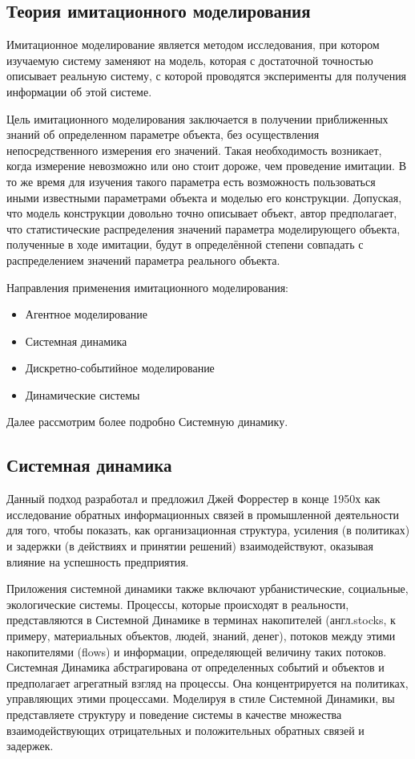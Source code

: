 \subsection{Теория имитационного моделирования}

Имитационное моделирование является методом исследования, при котором изучаемую систему заменяют на модель, которая с достаточной точностью описывает реальную систему, с которой проводятся эксперименты для получения информации об этой системе.

Цель имитационного моделирования заключается в получении приближенных знаний об определенном параметре объекта, без осуществления непосредственного измерения его значений. 
Такая необходимость возникает, когда измерение невозможно или оно стоит дороже, чем проведение имитации.
В то же время для изучения такого параметра есть возможность пользоваться иными известными параметрами объекта и моделью его конструкции.
Допуская, что модель конструкции довольно точно описывает объект, автор предполагает, что статистические распределения значений параметра моделирующего объекта, полученные в ходе имитации, будут в определённой степени совпадать с распределением значений параметра реального объекта.

Направления применения имитационного моделирования:

\begin{itemize}
\tightlist
\item  Агентное моделирование
\item  Системная динамика
\item  Дискретно-событийное моделирование
\item  Динамические системы
\end{itemize}
Далее рассмотрим более подробно Системную динамику.

\subsection{Системная динамика}

Данный подход разработал и предложил Джей Форрестер в конце 1950х как исследование обратных информационных связей в промышленной деятельности для того, чтобы показать, как организационная структура, усиления (в политиках) и задержки (в действиях и принятии решений) взаимодействуют, оказывая влияние на успешность предприятия.

Приложения системной динамики также включают урбанистические, социальные, экологические системы. Процессы, которые происходят в реальности, представляются в Системной Динамике в терминах накопителей (англ.stocks, к примеру, материальных объектов, людей, знаний, денег), потоков между этими накопителями (flows) и информации, определяющей величину таких потоков.
Системная Динамика абстрагирована от определенных событий и объектов и предполагает агрегатный взгляд на процессы.
Она концентрируется на политиках, управляющих этими процессами.
Моделируя в стиле Системной Динамики, вы представляете структуру и поведение системы в качестве множества взаимодействующих отрицательных и положительных обратных связей и задержек.

